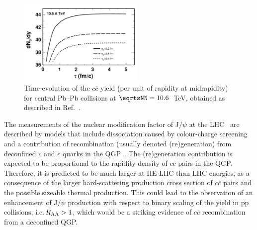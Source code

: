\documentclass[../report.tex]{subfiles}
\begin{document}
\begin{figure}[!t]
\begin{center}
\includegraphics[width=0.54\textwidth]{helhc/figs/charmKo_PbPbHE.pdf}
\caption{Time-evolution of the $c\overline c$ yield
  (per unit of rapidity at midrapidity) for central Pb--Pb collisions
  at $\sqrtsNN=10.6$~TeV, obtained as described in Ref.~\cite{Liu:2016zle}.}
\label{fig:thermalcharm}
\end{center}
\end{figure}




The measurements of the nuclear modification factor of J$/\psi$ at the LHC~\cite{Adam:2015isa,Adam:2015rba,Chatrchyan:2012np} 
are described by models that include dissociation caused by
colour-charge screening and a contribution of recombination
(usually denoted (re)generation) from deconfined $c$ and $\overline c$
quarks in the QGP~\cite{Liu:2009nb,Zhao:2011cv,Andronic:2011yq}. 
The (re)generation contribution is expected to be proportional to
the rapidity density of $c\overline c$ pairs in the QGP. 
Therefore, it is predicted to be much larger
at HE-LHC than LHC energies, as a consequence of the larger hard-scattering
production cross section of $c\overline c$ pairs and the possible 
sizeable thermal production.
This could lead to the observation of an enhancement of J$/\psi$
production with respect to binary scaling of the yield in pp
collisions, i.e.\,$R_{\rm AA}>1$, which would be a striking evidence of 
$c\overline c$ recombination from a deconfined QGP.


\end{document}
